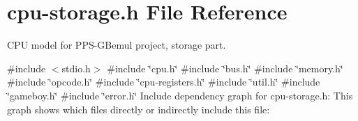 \hypertarget{cpu-storage_8h}{}\section{cpu-\/storage.h File Reference}
\label{cpu-storage_8h}


C\+PU model for P\+P\+S-\/\+G\+Bemul project, storage part.  


{\ttfamily \#include $<$stdio.\+h$>$}\newline
{\ttfamily \#include \char`\"{}cpu.\+h\char`\"{}}\newline
{\ttfamily \#include \char`\"{}bus.\+h\char`\"{}}\newline
{\ttfamily \#include \char`\"{}memory.\+h\char`\"{}}\newline
{\ttfamily \#include \char`\"{}opcode.\+h\char`\"{}}\newline
{\ttfamily \#include \char`\"{}cpu-\/registers.\+h\char`\"{}}\newline
{\ttfamily \#include \char`\"{}util.\+h\char`\"{}}\newline
{\ttfamily \#include \char`\"{}gameboy.\+h\char`\"{}}\newline
{\ttfamily \#include \char`\"{}error.\+h\char`\"{}}\newline
Include dependency graph for cpu-\/storage.h\+:
This graph shows which files directly or indirectly include this file\+:
